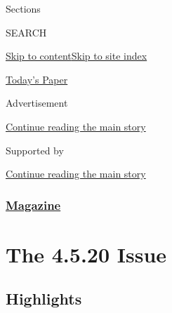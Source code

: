 Sections

SEARCH

\protect\hyperlink{site-content}{Skip to
content}\protect\hyperlink{site-index}{Skip to site index}

\href{https://myaccount.nytimes3xbfgragh.onion/auth/login?response_type=cookie\&client_id=vi}{}

\href{https://www.nytimes3xbfgragh.onion/section/todayspaper}{Today's
Paper}

Advertisement

\protect\hyperlink{after-top}{Continue reading the main story}

Supported by

\protect\hyperlink{after-sponsor}{Continue reading the main story}

\hypertarget{magazine}{%
\subsubsection{\texorpdfstring{\href{/section/magazine}{Magazine}}{Magazine}}\label{magazine}}

\hypertarget{the-4520-issue}{%
\section{The 4.5.20 Issue}\label{the-4520-issue}}

\hypertarget{highlights}{%
\subsection{Highlights}\label{highlights}}


